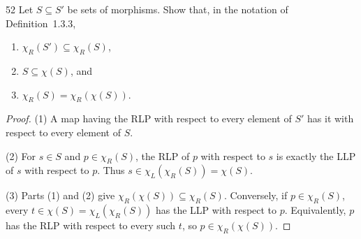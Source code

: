 \begin{exercise}{52}
Let $S\subseteq S'$ be sets of morphisms. Show that, in the notation of Definition~1.3.3,
\begin{enumerate}[label=(\arabic*)]
\item $\chi_R(S')\subseteq\chi_R(S)$,
\item $S\subseteq\chi(S)$, and
\item $\chi_R(S)=\chi_R(\chi(S))$.
\end{enumerate}

\begin{proof}
(1) A map having the RLP with respect to every element of $S'$
has it with respect to every element of $S$.

(2) For $s\in S$ and $p\in\chi_R(S)$, the RLP of $p$
with respect to $s$ is exactly the LLP of $s$ with respect
to $p$. Thus $s\in\chi_L(\chi_R(S))=\chi(S)$.

(3) Parts (1) and (2) give
$\chi_R(\chi(S))\subseteq\chi_R(S)$.
Conversely, if $p\in\chi_R(S)$, every
$t\in\chi(S)=\chi_L(\chi_R(S))$ has the LLP with respect to $p$.
Equivalently, $p$ has the RLP with respect to every such $t$,
so $p\in\chi_R(\chi(S))$.
\end{proof}
\end{exercise}
